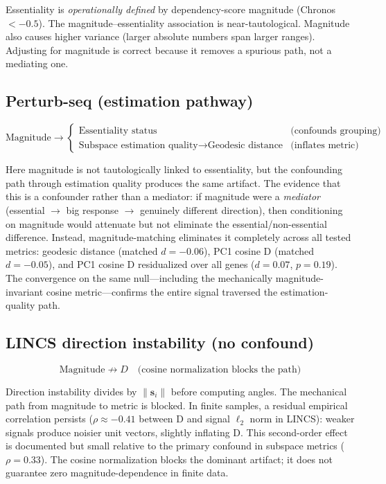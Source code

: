 \documentclass[11pt]{article}
\begin{document}
Essentiality is \emph{operationally defined} by dependency-score
magnitude (Chronos $< -0.5$). The magnitude--essentiality association is
near-tautological. Magnitude also causes higher variance (larger
absolute numbers span larger ranges). Adjusting for magnitude is correct
because it removes a spurious path, not a mediating one.

\subsection{Perturb-seq (estimation pathway)}

\begin{equation*}
\text{Magnitude} \rightarrow
\begin{cases}
\text{Essentiality status} & \text{(confounds grouping)} \\
\text{Subspace estimation quality} \rightarrow \text{Geodesic distance}
  & \text{(inflates metric)}
\end{cases}
\end{equation*}

Here magnitude is not tautologically linked to essentiality, but the
confounding path through estimation quality produces the same artifact.
The evidence that this is a confounder rather than a mediator: if
magnitude were a \emph{mediator} (essential $\rightarrow$ big response
$\rightarrow$ genuinely different direction), then conditioning on
magnitude would attenuate but not eliminate the essential/non-essential
difference. Instead, magnitude-matching eliminates it completely across all tested
metrics: geodesic distance (matched $d = -0.06$), PC1 cosine D (matched
$d = -0.05$), and PC1 cosine D residualized over all genes ($d = 0.07$,
$p = 0.19$). The convergence on the same null---including the
mechanically magnitude-invariant cosine metric---confirms the entire
signal traversed the estimation-quality path.

\subsection{LINCS direction instability (no confound)}

\begin{equation*}
\text{Magnitude} \not\rightarrow D \quad \text{(cosine normalization
blocks the path)}
\end{equation*}

Direction instability divides by $\|\mathbf{s}_i\|$ before computing
angles. The mechanical path from magnitude to metric is blocked.
In finite samples, a residual empirical correlation persists ($\rho
\approx -0.41$ between D and signal $\ell_2$ norm in LINCS): weaker
signals produce noisier unit vectors, slightly inflating D. This
second-order effect is documented but small relative to the primary
confound in subspace metrics ($\rho = 0.33$). The cosine normalization
blocks the dominant artifact; it does not guarantee zero
magnitude-dependence in finite data.
\end{document}

